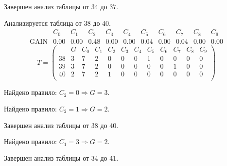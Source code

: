 Завершен анализ таблицы от 34 до 37.

Анализируется таблица от 38 до 40.
$$ 
\begin{array}{lcc|c|ccccccc}
	  & C_{0} & C_{1} & C_{2} & C_{3} & C_{4} & C_{5} & C_{6} & C_{7} & C_{8} & C_{9}\\
 \textrm{GAIN} & 0.00 & 0.00 & 0.48 & 0.00 & 0.00 & 0.04 & 0.00 & 0.04 & 0.00 & 0.00
\end{array}
 $$
$$
T = \left( \begin{array}{lccc|c|ccccccc}
	 & G & C_{0} & C_{1} & C_{2} & C_{3} & C_{4} & C_{5} & C_{6} & C_{7} & C_{8} & C_{9}\\
	38 & 3 & 7 & 2 & 0 & 0 & 0 & 1 & 0 & 0 & 0 & 0\\
	39 & 3 & 7 & 2 & 0 & 0 & 0 & 0 & 0 & 1 & 0 & 0\\
	40 & 2 & 7 & 2 & 1 & 0 & 0 & 0 & 0 & 0 & 0 & 0\\
\end{array} \right)
$$

Найдено правило: $C_{2} = 0 \Longrightarrow G = 3$.

Найдено правило: $C_{2} = 1 \Longrightarrow G = 2$.

Завершен анализ таблицы от 38 до 40.

Найдено правило: $C_{1} = 3 \Longrightarrow G = 2$.

Завершен анализ таблицы от 34 до 41.

